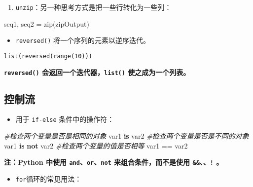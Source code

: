 \documentclass[]{article}
\newenvironment{Shaded}{}{}
\newcommand{\KeywordTok}[1]{\textcolor[rgb]{0.00,0.44,0.13}{\textbf{#1}}}
\newcommand{\CommentTok}[1]{\textcolor[rgb]{0.38,0.63,0.69}{\textit{#1}}}
\newcommand{\OperatorTok}[1]{\textcolor[rgb]{0.40,0.40,0.40}{#1}}
\newcommand{\BuiltInTok}[1]{#1}
\newcommand{\NormalTok}[1]{#1}
\begin{document}
\begin{enumerate}
\def\labelenumi{\arabic{enumi}.}
\item
  \texttt{unzip}：另一种思考方式是把一些行转化为一些列：
\end{enumerate}

\begin{Shaded}
\begin{Highlighting}[]
\NormalTok{seq1, seq2 }\OperatorTok{=} \BuiltInTok{zip}\NormalTok{(zipOutput)}
\end{Highlighting}
\end{Shaded}

\begin{itemize}
\item
  \texttt{reversed()} 将一个序列的元素以逆序迭代。
\end{itemize}

\begin{verbatim}
list(reversed(range(10))) 
\end{verbatim}

\textbf{\texttt{reversed()} 会返回一个迭代器，\texttt{list()}
使之成为一个列表。}

\hypertarget{header-n307}{\subsection{控制流}\label{header-n307}}

\begin{itemize}
\item
  用于 \texttt{if-else} 条件中的操作符：
\end{itemize}

\begin{Shaded}
\begin{Highlighting}[]
\CommentTok{#检查两个变量是否是相同的对象}
\NormalTok{var1 }\KeywordTok{is}\NormalTok{ var2}
\CommentTok{#检查两个变量是否是不同的对象}
\NormalTok{var1 }\KeywordTok{is} \KeywordTok{not}\NormalTok{ var2}
\CommentTok{#检查两个变量的值是否相等}
\NormalTok{var1 }\OperatorTok{==}\NormalTok{ var2}
\end{Highlighting}
\end{Shaded}

\textbf{注：Python 中使用 \texttt{and}、\texttt{or}、\texttt{not}
来组合条件，而不是使用
\texttt{\&\&}、\texttt{\textbar{}\textbar{}}、\texttt{!} 。}

\begin{itemize}
\item
  \texttt{for}循环的常见用法：
\end{itemize}
\end{document}
